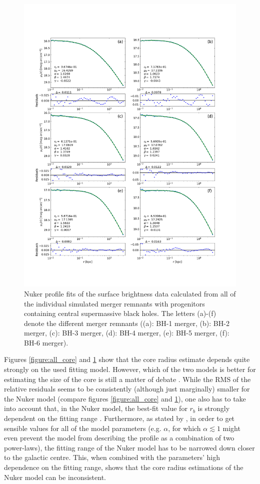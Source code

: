 \documentclass[english, oneside]{HYgradu}
\begin{document}
\begin{figure}
	\centering
	\includegraphics[width=\textwidth]{all_nuker_profiles.png}
	\caption{Nuker profile fits of the surface brightness data calculated from all of the individual simulated merger remnants with progenitors containing central supermassive black holes. The letters (a)-(f) denote the different merger remnants ((a): BH-1 merger, (b): BH-2 merger, (c): BH-3 merger, (d): BH-4 merger, (e): BH-5 merger, (f): BH-6 merger).}
	\label{figure:all_nuker}
\end{figure}

Figures \ref{figure:all_core} and \ref{figure:all_nuker} show that the core radius estimate depends quite strongly on the used fitting model. However, which of the two models is better for estimating the size of the core is still a matter of debate \citep{Lauer2007, Dullo2012}. While the RMS of the relative residuals seems to be consistently (although just marginally) smaller for the Nuker model (compare figures \ref{figure:all_core} and \ref{figure:all_nuker}), one also has to take into account that, in the Nuker model, the best-fit value for $r_b$ is strongly dependent on the fitting range \citep{Graham2003Nuker}. Furthermore, as stated by \cite{Rantala2018}, in order to get sensible values for all of the model parameters (e.g. $\alpha$, for which $\alpha \lesssim 1$ might even prevent the model from describing the profile as a combination of two power-laws), the fitting range of the Nuker model has to be narrowed down closer to the galactic centre. This, when combined with the parameters' high dependence on the fitting range, shows that the core radius estimations of the Nuker model can be inconsistent.
\end{document}
